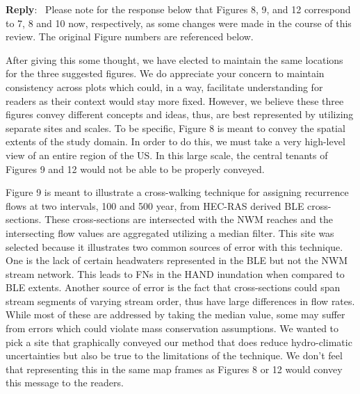 \documentclass[11pt]{article}
\newenvironment{reply}
   {\medskip \noindent \begin{sf}\textbf{Reply}:\  }
   {\medskip \end{sf}}
\begin{document}
\begin{reply}
Please note for the response below that Figures 8, 9, and 12 correspond to 7, 8 and 10 now, respectively, as some changes were made in the course of this review.
The original Figure numbers are referenced below.

After giving this some thought, we have elected to maintain the same locations for the three suggested figures.
We do appreciate your concern to maintain consistency across plots which could, in a way, facilitate understanding for readers as their context would stay more fixed.
However, we believe these three figures convey different concepts and ideas, thus, are best represented by utilizing separate sites and scales.
To be specific, Figure 8 is meant to convey the spatial extents of the study domain. 
In order to do this, we must take a very high-level view of an entire region of the US.
In this large scale, the central tenants of Figures 9 and 12 would not be able to be properly conveyed.

Figure 9 is meant to illustrate a cross-walking technique for assigning recurrence flows at two intervals, 100 and 500 year, from HEC-RAS derived BLE cross-sections.
These cross-sections are intersected with the NWM reaches and the intersecting flow values are aggregated utilizing a median filter.
This site was selected because it illustrates two common sources of error with this technique.
One is the lack of certain headwaters represented in the BLE but not the NWM stream network.
This leads to FNs in the HAND inundation when compared to BLE extents.
Another source of error is the fact that cross-sections could span stream segments of varying stream order, thus have large differences in flow rates.
While most of these are addressed by taking the median value, some may suffer from errors which could violate mass conservation assumptions.
We wanted to pick a site that graphically conveyed our method that does reduce hydro-climatic uncertainties but also be true to the limitations of the technique.
We don't feel that representing this in the same map frames as Figures 8 or 12 would convey this message to the readers.


\end{reply}
\end{document}
